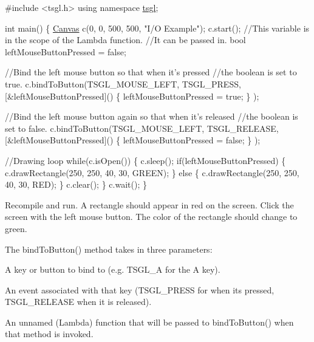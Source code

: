 \begin{DoxyCode}
\textcolor{preprocessor}{#include <tsgl.h>}
\textcolor{keyword}{using namespace }\hyperlink{namespacetsgl}{tsgl};

\textcolor{keywordtype}{int} main() \{
  \hyperlink{classtsgl_1_1_canvas}{Canvas} c(0, 0, 500, 500, \textcolor{stringliteral}{"I/O Example"});
  c.start();
  \textcolor{comment}{//This variable is in the scope of the Lambda function. }
  \textcolor{comment}{//It can be passed in.}
  \textcolor{keywordtype}{bool} leftMouseButtonPressed = \textcolor{keyword}{false};

  \textcolor{comment}{//Bind the left mouse button so that when it's pressed }
  \textcolor{comment}{//the boolean is set to true.}
  c.bindToButton(TSGL\_MOUSE\_LEFT, TSGL\_PRESS, 
                    [&leftMouseButtonPressed]() \{
                          leftMouseButtonPressed = \textcolor{keyword}{true};
                    \}
                );

  \textcolor{comment}{//Bind the left mouse button again so that when it's released }
  \textcolor{comment}{//the boolean is set to false.}
  c.bindToButton(TSGL\_MOUSE\_LEFT, TSGL\_RELEASE, 
                    [&leftMouseButtonPressed]() \{
                          leftMouseButtonPressed = \textcolor{keyword}{false};
                    \}
                );

  \textcolor{comment}{//Drawing loop}
  \textcolor{keywordflow}{while}(c.isOpen()) \{
    c.sleep();
    \textcolor{keywordflow}{if}(leftMouseButtonPressed) \{
      c.drawRectangle(250, 250, 40, 30, GREEN);
    \} \textcolor{keywordflow}{else} \{
      c.drawRectangle(250, 250, 40, 30, RED);
    \}
    c.clear();
  \}
  c.wait();
\}
\end{DoxyCode}


Recompile and run. A rectangle should appear in red on the screen. Click the screen with the left mouse button. The color of the rectangle should change to green.

The bind\+To\+Button() method takes in three parameters\+:
\begin{DoxyItemize}
\item A key or button to bind to (e.\+g. T\+S\+G\+L\+\_\+\+A for the \textquotesingle{}A\textquotesingle{} key).
\item An event associated with that key (T\+S\+G\+L\+\_\+\+P\+R\+E\+S\+S for when it\textquotesingle{}s pressed, T\+S\+G\+L\+\_\+\+R\+E\+L\+E\+A\+S\+E when it is released).
\item An unnamed (Lambda) function that will be passed to bind\+To\+Button() when that method is invoked.
\end{DoxyItemize}

